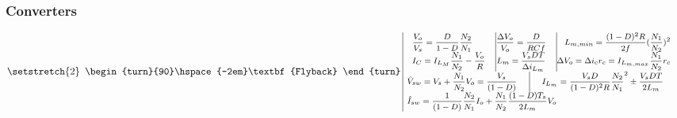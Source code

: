 \documentclass[twocolumn]{article}
\begin{document}
\subsubsection*{Converters}
\vspace*{-0.2cm}
\begin{equation}
{\setstretch{2}
\begin{array}{c|c}
{\begin{turn}{90}\hspace{-2em}\textbf{Flyback} \end{turn}} \hspace{-0.1cm} & \hspace{-0.2cm}
{\begin{array}{l}
\begin{array}{r  c  c}
\textrm{\footnotesize $\displaystyle  \frac{V_o}{V_s} = \frac{D}{1-D} \frac{N_2}{N_1}$}\hfill &\vline \hfill \textrm{\footnotesize $\displaystyle  \frac{\Delta V_o}{V_o} = \frac{D}{RCf} $} \hfill&\vline\hfill \textrm{\footnotesize $ \displaystyle   L_{m,min} = \frac{(1-D)^2R}{2f}(\frac{N_1}{N_2})^2 $} \nonumber\\
\textrm{\footnotesize $\displaystyle I_C=I_{L_M} \frac{N_1}{N_2}- \frac{V_o }{R}$}\hfill &\vline \hfill\textrm{\footnotesize $\displaystyle  L_m = \frac{V_s D T}{\Delta i_{L_m}}$}\hfill &\vline\hfill \textrm{\footnotesize $ \displaystyle \Delta V_o =\Delta i_c r_c = I_{L_{m,max}}\frac{N_1}{N_2} r_c $}\nonumber\\
\end{array}\\
\textrm{\footnotesize $\displaystyle \hat{V}_{sw} = V_s + \frac{N_1}{N_2}V_o= \frac{V_s}{(1-D)}$} \hfill \vline \hfill \textrm{\footnotesize $\displaystyle I_{L_{m}} = \frac{V_sD}{(1-D)^2R}\frac{N_2}{N_1}^2\pm \displaystyle \frac{V_sDT}{2L_m}$}\hfill\\
\textrm{\footnotesize $\displaystyle \hat{I}_{sw} = \frac{1}{(1-D)}\frac{N_2}{N_1} I_o+\displaystyle \frac{N_1}{N_2}\frac{(1-D)T_s}{2L_m}V_o$\vspace{0.4cm}}\\
\end{array}}
\end{array}}
\end{equation}
\end{document}
